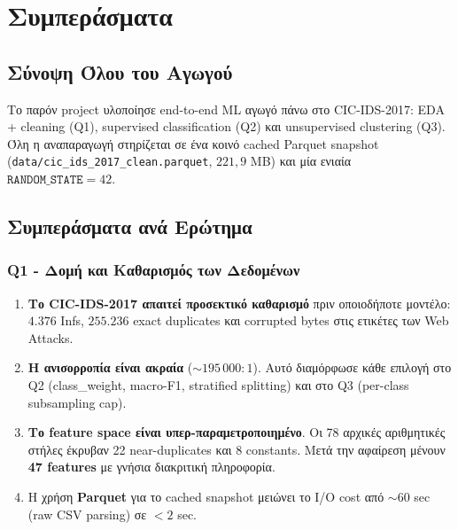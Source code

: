 \documentclass[12pt,a4paper,twoside]{book}
\begin{document}
\chapter{Συμπεράσματα}\label{ch:conclusions}

\section{Σύνοψη Όλου του Αγωγού}

Το παρόν project υλοποίησε end-to-end ML αγωγό πάνω στο CIC-IDS-2017:
EDA + cleaning (Q1), supervised classification (Q2) και unsupervised
clustering (Q3). Όλη η αναπαραγωγή στηρίζεται σε ένα κοινό cached
Parquet snapshot (\texttt{data/cic\_ids\_2017\_clean.parquet},
\(221{,}9\) MB) και μία ενιαία \(\texttt{RANDOM\_STATE} = 42\).

\section{Συμπεράσματα ανά Ερώτημα}

\subsection{Q1 - Δομή και Καθαρισμός των Δεδομένων}
\begin{enumerate}
    \item \textbf{Το CIC-IDS-2017 απαιτεί προσεκτικό καθαρισμό} πριν
    οποιοδήποτε μοντέλο: \(4.376\) Infs, \(255.236\) exact duplicates και
    corrupted bytes στις ετικέτες των Web Attacks.
    \item \textbf{Η ανισορροπία είναι ακραία} (\(\sim 195\,000:1\)). Αυτό
    διαμόρφωσε κάθε επιλογή στο Q2 (class\_weight, macro-F1, stratified
    splitting) και στο Q3 (per-class subsampling cap).
    \item \textbf{Το feature space είναι υπερ-παραμετροποιημένο}. Οι 78
    αρχικές αριθμητικές στήλες έκρυβαν 22 near-duplicates και 8 constants.
    Μετά την αφαίρεση μένουν \textbf{47 features} με γνήσια διακριτική
    πληροφορία.
    \item Η χρήση \textbf{Parquet} για το cached snapshot μειώνει το I/O
    cost από \(\sim 60\) sec (raw CSV parsing) σε \(<2\) sec.
\end{enumerate}
\end{document}
